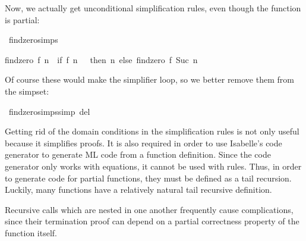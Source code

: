 \begin{isabellebody}
\begin{isamarkuptext}
  
  \noindent Now, we actually get unconditional simplification rules, even
  though the function is partial:%
\end{isamarkuptext}%
\isamarkuptrue%
\isamarkupfalse%
\ findzero{\isachardot}simps%
\begin{isamarkuptext}%
\begin{isabelle}%
findzero\ {\isacharquery}f\ {\isacharquery}n\ {\isacharequal}\ {\isacharparenleft}if\ {\isacharquery}f\ {\isacharquery}n\ {\isacharequal}\ {}\ then\ {\isacharquery}n\ else\ findzero\ {\isacharquery}f\ {\isacharparenleft}Suc\ {\isacharquery}n{\isacharparenright}{\isacharparenright}%
\end{isabelle}

  \noindent Of course these would make the simplifier loop, so we better remove
  them from the simpset:%
\end{isamarkuptext}%
\isamarkuptrue%
\isamarkupfalse%
\ findzero{\isachardot}simps{\isacharbrackleft}simp\ del{\isacharbrackright}%
\begin{isamarkuptext}%
Getting rid of the domain conditions in the simplification rules is
  not only useful because it simplifies proofs. It is also required in
  order to use Isabelle's code generator to generate ML code
  from a function definition.
  Since the code generator only works with equations, it cannot be
  used with  rules. Thus, in order to generate code for
  partial functions, they must be defined as a tail recursion.
  Luckily, many functions have a relatively natural tail recursive
  definition.%
\end{isamarkuptext}%
\isamarkuptrue%
%
\isamarkuptrue%
%
\begin{isamarkuptext}%
Recursive calls which are nested in one another frequently cause
  complications, since their termination proof can depend on a partial
  correctness property of the function itself. 


\end{isamarkuptext}
\end{isabellebody}
